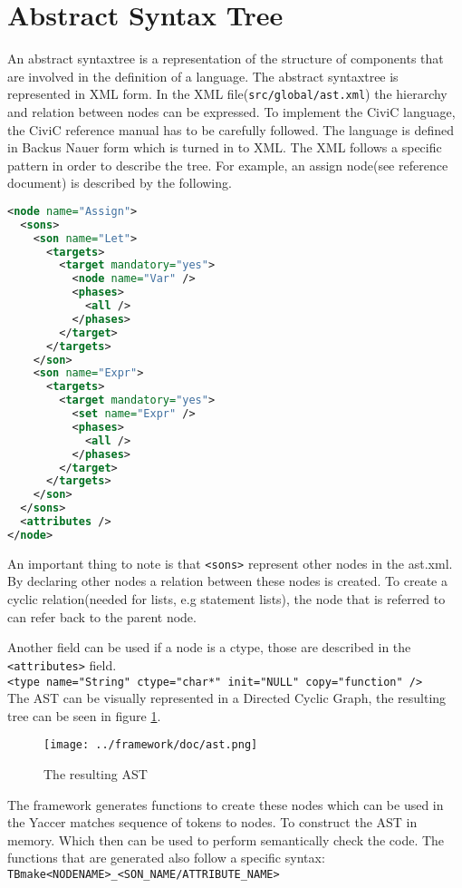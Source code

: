 \documentclass[a4paper]{article}
\begin{document}
\section{Abstract Syntax Tree}
An abstract syntaxtree is a representation of the structure of components that
are involved in the definition of a language.
The abstract syntaxtree is represented in XML form. In the XML
file(\texttt{src/global/ast.xml}) the hierarchy and relation between nodes can
be expressed. To implement the CiviC language, the CiviC reference manual has
to be carefully followed. The language is defined in Backus Nauer form which is
turned in to XML. The XML follows a specific pattern in order to describe the tree.
For example, an assign node(see reference document) is described by the
following.

\begin{lstlisting}[language=XML]
 <node name="Assign">
  <sons>
    <son name="Let">
      <targets>
        <target mandatory="yes">
          <node name="Var" />
          <phases>
            <all />
          </phases>
        </target>
      </targets>
    </son>
    <son name="Expr">
      <targets>
        <target mandatory="yes">
          <set name="Expr" />
          <phases>
            <all />
          </phases>
        </target>
      </targets>
    </son>
  </sons>
  <attributes />
</node>
\end{lstlisting}

An important thing to note is that \texttt{<sons>} represent other nodes in the ast.xml.
By declaring other nodes a relation between these nodes is created. To create a cyclic
relation(needed for lists, e.g statement lists), the node that is referred to can refer back to the parent node.

Another field can be used if a node is a ctype, those are described in the \texttt{<attributes>} field.\\
\texttt{<type name="String" ctype="char*" init="NULL" copy="function" />}
\\
The AST can be visually represented in a Directed Cyclic Graph, the resulting
tree can be seen in figure \ref{fig:ast.png}.

\begin{figure}[h!]
    \texttt{[image: ../framework/doc/ast.png]}
\label{fig:ast.png}
\caption{The resulting AST}
\end{figure}

The framework generates functions to create these nodes which can be used in
the Yaccer matches sequence of tokens to nodes. To construct the AST in memory.
Which then can be used to perform semantically check the code. The functions
that are generated also follow a specific syntax:\\
\texttt{TBmake<NODENAME>\_<SON\_NAME/ATTRIBUTE\_NAME>}
\end{document}
